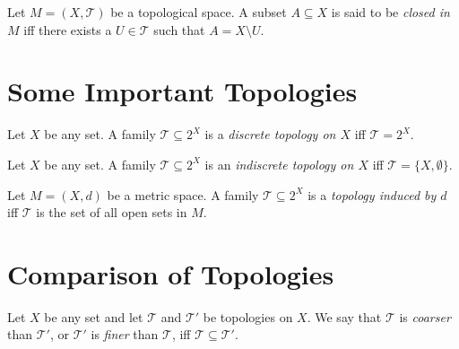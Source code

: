 \begin{definition}
	\label{definition: closed set}
	Let $M = (X, \mathcal T)$ be a topological space. A subset $A \subseteq X$ is said to be \textit{closed in $M$} iff there exists a $U \in \mathcal T$ such that $A = X \setminus U$.
\end{definition}


\section{Some Important Topologies}


\begin{definition}
	\label{definition: discrete topology}
	Let $X$ be any set. A family $\mathcal T \subseteq 2^X$ is a \textit{discrete topology on $X$} iff $\mathcal T = 2^X$.
\end{definition}


\begin{definition}
	\label{definition: indiscrete topology}
	Let $X$ be any set. A family $\mathcal T \subseteq 2^X$ is an \textit{indiscrete topology on $X$} iff $\mathcal T = \{X, \emptyset\}$.
\end{definition}


\begin{definition}
	\label{definition: induced topology}
	Let $M = (X, d)$ be a metric space. A family $\mathcal T \subseteq 2^X$ is a \textit{topology induced by $d$} iff $\mathcal T$ is the set of all open sets in $M$.
\end{definition}


\section{Comparison of Topologies}


\begin{definition}
	\label{definition: comparison of topologies}
	Let $X$ be any set and let $\mathcal T$ and $\mathcal T'$ be topologies on $X$. We say that $\mathcal T$ is \textit{coarser} than $\mathcal T'$, or $\mathcal T'$ is \textit{finer} than $\mathcal T$, iff $\mathcal T \subseteq \mathcal T'$.
\end{definition}


